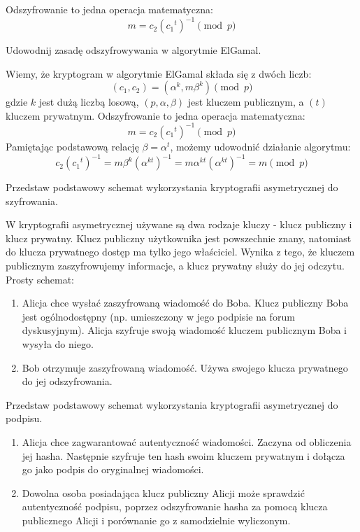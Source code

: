 \documentclass[answers,11pt]{exam}
\begin{document}
\begin{questions}
\begin{solution}
Odszyfrowanie to jedna operacja matematyczna:
\begin{equation}
 m = c_2({c_1}^t)^{-1} \pmod{p}
\end{equation}
\end{solution}

\question Udowodnij zasadę odszyfrowywania w algorytmie ElGamal.
\begin{solution}
Wiemy, że kryptogram w algorytmie ElGamal składa się z dwóch liczb:
\begin{equation}
 (c_1, c_2) = (\alpha^k, m\beta^k) \pmod{p}
\end{equation}
gdzie $k$ jest dużą liczbą losową, $(p,\alpha,\beta)$ jest kluczem publicznym, a $(t)$ kluczem prywatnym. 
Odszyfrowanie to jedna operacja matematyczna:
\begin{equation}
 m = c_2({c_1}^t)^{-1} \pmod{p}
\end{equation}
Pamiętając podstawową relację $\beta=\alpha^t$, możemy udowodnić działanie algorytmu:
\begin{equation}
 c_2({c_1}^t)^{-1} = m\beta^k (\alpha^{kt})^{-1} =  m\alpha^{kt} (\alpha^{kt})^{-1}  = m \pmod{p}
\end{equation}
\end{solution}

\question Przedstaw podstawowy schemat wykorzystania kryptografii asymetrycznej do szyfrowania.
\begin{solution}
W kryptografii asymetrycznej używane są dwa rodzaje kluczy - klucz publiczny i klucz prywatny. Klucz publiczny użytkownika jest powszechnie znany, natomiast do klucza prywatnego dostęp ma tylko jego właściciel. Wynika z tego, że kluczem publicznym zaszyfrowujemy informacje, a klucz prywatny służy do jej odczytu. Prosty schemat:
\begin{enumerate}
\item Alicja chce wysłać zaszyfrowaną wiadomość do Boba. Klucz publiczny Boba jest ogólnodostępny (np. umieszczony w jego podpisie na forum dyskusyjnym). Alicja szyfruje swoją wiadomość kluczem publicznym Boba i wysyła do niego.
\item Bob otrzymuje zaszyfrowaną wiadomość. Używa swojego klucza prywatnego do jej odszyfrowania.
\end{enumerate}
\end{solution}

\question Przedstaw podstawowy schemat wykorzystania kryptografii asymetrycznej do podpisu.
\begin{solution}
\begin{enumerate}
\item Alicja chce zagwarantować autentyczność wiadomości. Zaczyna od obliczenia jej hasha. Następnie szyfruje ten hash swoim kluczem prywatnym i dołącza go jako podpis do oryginalnej wiadomości.
\item Dowolna osoba posiadająca klucz publiczny Alicji może sprawdzić autentyczność podpisu, poprzez odszyfrowanie hasha za pomocą klucza publicznego Alicji i porównanie go z samodzielnie wyliczonym.
\end{enumerate}
\end{solution}


\end{questions}
\end{document}
